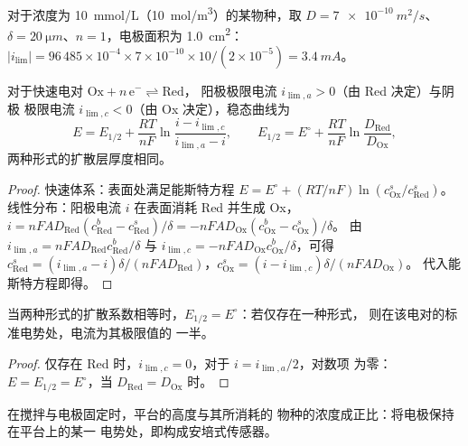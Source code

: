 \begin{example}[极限电流的大小]\label{ex:b2:current-potential-curves:ilim}
对于浓度为 \qty{10}{mmol/L}（\qty{10}{mol/m^3}）的某物种，取 $D =
\qty{7e-10}{m^2/s}$、$\delta = \qty{20}{\micro m}$、$n = 1$，电极面积为
\qty{1.0}{cm^2}：$|i_{\lim}| = 96\,485 \times 10^{-4} \times 7 \times 10^{-10}
\times 10/(2 \times 10^{-5}) = \qty{3.4}{mA}$。
\end{example}

\begin{theorem}[快速体系的波]\label{thm:b2:current-potential-curves:wave}
对于快速电对 $\mathrm{Ox} + n\,\mathrm e^- \rightleftharpoons \mathrm{Red}$，
阳极极限电流 $i_{\lim,a} > 0$（由 Red 决定）与阴极
极限电流 $i_{\lim,c} < 0$（由 Ox 决定），稳态曲线为
\[
  E = E_{1/2} + \frac{RT}{nF}\ln\frac{i - i_{\lim,c}}{i_{\lim,a} - i},
  \qquad E_{1/2} = E^\circ + \frac{RT}{nF}\ln\frac{D_{\text{Red}}}{D_{\text{Ox}}} ,
\]
两种形式的扩散层厚度相同。
\end{theorem}

\begin{proof}
快速体系：表面处满足能斯特方程 $E = E^\circ + (RT/nF)
\ln(c^s_{\text{Ox}}/c^s_{\text{Red}})$。线性分布：阳极电流 $i$
在表面消耗 Red 并生成 Ox，$i = nFAD_{\text{Red}}(c^b_{\text{Red}}
- c^s_{\text{Red}})/\delta = -nFAD_{\text{Ox}}(c^b_{\text{Ox}} - c^s_{\text{Ox}})/\delta$。
由 $i_{\lim,a} = nFAD_{\text{Red}}c^b_{\text{Red}}/\delta$ 与 $i_{\lim,c} =
-nFAD_{\text{Ox}}c^b_{\text{Ox}}/\delta$，可得 $c^s_{\text{Red}} = (i_{\lim,a} -
i)\delta/(nFAD_{\text{Red}})$，$c^s_{\text{Ox}} = (i - i_{\lim,c})\delta/(nFAD_{\text{Ox}})$。
代入能斯特方程即得。
\end{proof}

\begin{corollary}[半波电势]\label{cor:b2:current-potential-curves:half-wave}
当两种形式的扩散系数相等时，$E_{1/2} = E^\circ$：若仅存在一种形式，
则在该电对的标准电势处，电流为其极限值的
一半。
\end{corollary}

\begin{proof}
仅存在 Red 时，$i_{\lim,c} = 0$，对于 $i = i_{\lim,a}/2$，对数项
为零：$E = E_{1/2} = E^\circ$，当 $D_{\text{Red}} = D_{\text{Ox}}$ 时。
\end{proof}

\begin{proposition}[平台高度测量浓度]\label{prop:b2:current-potential-curves:plateau}
在搅拌与电极固定时，平台的高度与其所消耗的
物种的浓度成正比：将电极保持在平台上的某一
电势处，即构成安培式传感器。
\end{proposition}

